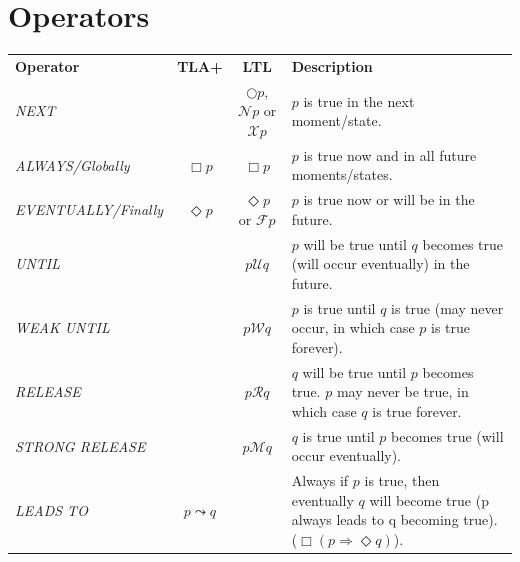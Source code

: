\section{Operators}
\begin{center}
    \begin{tabular}{l c c p{}}
        \textbf{Operator} & \textbf{TLA+} & \textbf{LTL} & \textbf{Description} \\
        \textit{NEXT} & & $\bigcirc p$, $\mathcal{N} p$ or $\mathcal{X} p$ & $p$ is true in the next moment/state. \\
        \textit{ALWAYS/Globally} & $\Box p$ & $\Box p$ & $p$ is true now and in all future moments/states. \\
        \textit{EVENTUALLY/Finally} & $\Diamond p$ & $\Diamond p$ or $\mathcal{F} p$ & $p$ is true now or will be in the future. \\
        \textit{UNTIL} & & $p \mathcal{U} q$ & $p$ will be true until $q$ becomes true (will occur eventually) in the future. \\
        \textit{WEAK UNTIL} & & $p \mathcal{W} q$ & $p$ is true until $q$ is true (may never occur, in which case $p$ is true forever). \\
        \textit{RELEASE} & & $p \mathcal{R} q$ & $q$ will be true until $p$ becomes true. $p$ may never be true, in which case $q$ is true forever. \\
        \textit{STRONG RELEASE} & & $p \mathcal{M} q$ & $q$ is true until $p$ becomes true (will occur eventually). \\
        \textit{LEADS TO} & $p \leadsto q$ & & Always if $p$ is true, then eventually $q$ will become true (p always leads to q becoming true). ($\Box (p \Rightarrow \Diamond q)$). \\
    \end{tabular}
\end{center}


